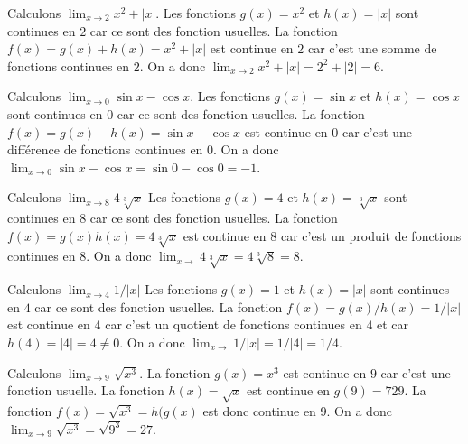 \documentclass[main.tex]{subfiles}
\begin{document}
\begin{example}
 
    Calculons $\lim_{x \to 2} x^2 + |x|.$ Les fonctions $g(x) = x^2$ et $h(x) = |x|$ sont continues en $2$ car ce sont des fonction usuelles.
    La fonction $f(x) = g(x) + h(x) = x^2 + |x|$ est continue en $2$ car c'est une somme de fonctions continues en $2$.
    On a donc $\lim_{x \to 2} x^2 + |x| = 2^2 + |2| = 6$.
\end{example}

\begin{example}
 
    Calculons $\lim_{x \to 0} \sin x - \cos x.$ Les fonctions $g(x) = \sin x$ et $h(x) = \cos x$ sont continues en $0$ car ce sont des fonction usuelles.
    La fonction $f(x) = g(x) - h(x) = \sin x - \cos x$ est continue en $0$ car c'est une différence de fonctions continues en $0$.
    On a donc $\lim_{x \to 0} \sin x - \cos x = \sin 0 - \cos 0 = -1$.
\end{example}

\begin{example}
 
    Calculons $\lim_{x \to 8} 4 \sqrt[3]{x}$ Les fonctions $g(x) = 4$ et $h(x) = \sqrt[3]{x}$ sont continues en $8$ car ce sont des fonction usuelles.
    La fonction $f(x) = g(x)h(x) = 4 \sqrt[3]{x}$ est continue en $8$ car c'est un produit de fonctions continues en $8$.
    On a donc $\lim_{x \to } 4 \sqrt[3]{x} = 4 \sqrt[3]{8} = 8$.
\end{example}

\begin{example}
 
    Calculons $\lim_{x \to 4} 1/|x|$ Les fonctions $g(x) = 1$ et $h(x) = |x|$ sont continues en $4$ car ce sont des fonction usuelles.
    La fonction $f(x) = g(x)/h(x) = 1/|x|$ est continue en $4$ car c'est un quotient de fonctions continues en $4$
    et car $h(4) = |4| = 4 \ne 0$.
    On a donc $\lim_{x \to } 1/|x| = 1/|4| = 1/4$.
\end{example}

\begin{example}
 
    Calculons $\lim_{x \to 9} \sqrt{x^3}$. La fonction $g(x) = x^3$ est continue en $9$ car c'est une fonction usuelle. 
    La fonction $h(x) = \sqrt{x}$ est continue en $g(9) = 729$.
    La fonction $f(x) = \sqrt{x^3} = h(g(x)$ est donc continue en $9$.
    On a donc $\lim_{x \to 9} \sqrt{x^3} = \sqrt{9^3} = 27$.
\end{example}
\end{document}
